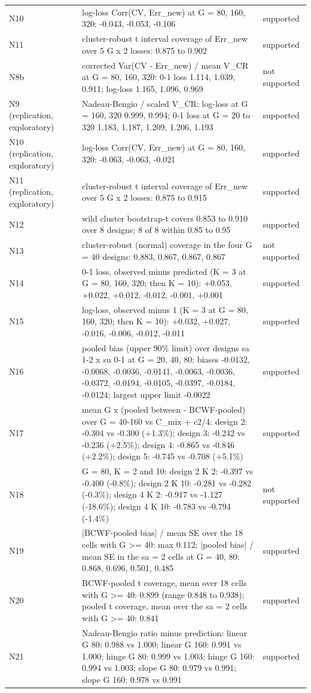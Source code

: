 \documentclass[11pt]{article}
\begin{document}
\begin{longtable}{lL{2.6cm}L{9.6cm}l}
N10 &  & log-loss Corr(CV, Err\_new) at G = 80, 160, 320: -0.043, -0.053, -0.106 & supported \\
N11 &  & cluster-robust t interval coverage of Err\_new over 5 G x 2 losses: 0.875 to 0.902 & supported \\
N8b &  & corrected Var(CV - Err\_new) / mean V\_CR at G = 80, 160, 320: 0-1 loss 1.114, 1.039, 0.911; log-loss 1.165, 1.096, 0.969 & not supported \\
N9 (replication, exploratory) &  & Nadeau-Bengio / scaled V\_CR: log-loss at G = 160, 320 0.999, 0.994; 0-1 loss at G = 20 to 320 1.183, 1.187, 1.209, 1.206, 1.193 & supported \\
N10 (replication, exploratory) &  & log-loss Corr(CV, Err\_new) at G = 80, 160, 320: -0.063, -0.063, -0.021 & supported \\
N11 (replication, exploratory) &  & cluster-robust t interval coverage of Err\_new over 5 G x 2 losses: 0.875 to 0.915 & supported \\
N12 &  & wild cluster bootstrap-t covers 0.853 to 0.910 over 8 designs; 8 of 8 within 0.85 to 0.95 & supported \\
N13 &  & cluster-robust (normal) coverage in the four G = 40 designs: 0.883, 0.867, 0.867, 0.867 & not supported \\
N14 &  & 0-1 loss, observed minus predicted (K = 3 at G = 80, 160, 320; then K = 10): +0.053, +0.022, +0.012, -0.012, -0.001, +0.001 & supported \\
N15 &  & log-loss, observed minus 1 (K = 3 at G = 80, 160, 320; then K = 10): +0.032, +0.027, -0.016, -0.006, -0.012, -0.011 & supported \\
N16 &  & pooled bias (upper 90\% limit) over designs sa 1-2 x su 0-1 at G = 20, 40, 80: biases -0.0132, -0.0068, -0.0036, -0.0141, -0.0063, -0.0036, -0.0372, -0.0194, -0.0105, -0.0397, -0.0184, -0.0124; largest upper limit -0.0022 & supported \\
N17 &  & mean G x (pooled between - BCWF-pooled) over G = 40-160 vs C\_mix + c2/4: design 2: -0.304 vs -0.300 (+1.3\%); design 3: -0.242 vs -0.236 (+2.5\%); design 4: -0.865 vs -0.846 (+2.2\%); design 5: -0.745 vs -0.708 (+5.1\%) & supported \\
N18 &  & G = 80, K = 2 and 10: design 2 K 2: -0.397 vs -0.400 (-0.8\%); design 2 K 10: -0.281 vs -0.282 (-0.3\%); design 4 K 2: -0.917 vs -1.127 (-18.6\%); design 4 K 10: -0.783 vs -0.794 (-1.4\%) & not supported \\
N19 &  & |BCWF-pooled bias| / mean SE over the 18 cells with G >= 40: max 0.112; |pooled bias| / mean SE in the sa = 2 cells at G = 40, 80: 0.868, 0.696, 0.501, 0.485 & supported \\
N20 &  & BCWF-pooled t coverage, mean over 18 cells with G >= 40: 0.899 (range 0.848 to 0.938); pooled t coverage, mean over the sa = 2 cells with G >= 40: 0.841 & supported \\
N21 &  & Nadeau-Bengio ratio minus prediction: linear G 80: 0.988 vs 1.000; linear G 160: 0.991 vs 1.000; hinge G 80: 0.999 vs 1.003; hinge G 160: 0.994 vs 1.003; slope G 80: 0.979 vs 0.991; slope G 160: 0.978 vs 0.991 & supported \\
\bottomrule
\end{longtable}
\end{document}
